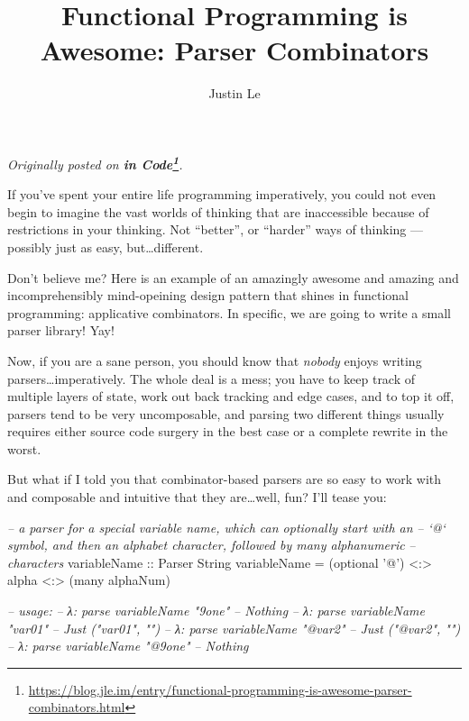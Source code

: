 \documentclass[]{article}
\title{Functional Programming is Awesome: Parser Combinators}
\author{Justin Le}
\newenvironment{Shaded}{}{}
\newcommand{\DataTypeTok}[1]{\textcolor[rgb]{0.56,0.13,0.00}{{#1}}}
\newcommand{\CharTok}[1]{\textcolor[rgb]{0.25,0.44,0.63}{{#1}}}
\newcommand{\CommentTok}[1]{\textcolor[rgb]{0.38,0.63,0.69}{\textit{{#1}}}}
\newcommand{\OtherTok}[1]{\textcolor[rgb]{0.00,0.44,0.13}{{#1}}}
\newcommand{\FunctionTok}[1]{\textcolor[rgb]{0.02,0.16,0.49}{{#1}}}
\newcommand{\NormalTok}[1]{{#1}}
\renewcommand{\href}[2]{#2\footnote{\url{#1}}}
\begin{document}
\maketitle

\emph{Originally posted on
\textbf{\href{https://blog.jle.im/entry/functional-programming-is-awesome-parser-combinators.html}{in
Code}}.}

If you've spent your entire life programming imperatively, you could not
even begin to imagine the vast worlds of thinking that are inaccessible
because of restrictions in your thinking. Not ``better'', or ``harder''
ways of thinking --- possibly just as easy, but\ldots{}different.

Don't believe me? Here is an example of an amazingly awesome and amazing
and incomprehensibly mind-opeining design pattern that shines in
functional programming: applicative combinators. In specific, we are
going to write a small parser library! Yay!

Now, if you are a sane person, you should know that \emph{nobody} enjoys
writing parsers\ldots{}imperatively. The whole deal is a mess; you have
to keep track of multiple layers of state, work out back tracking and
edge cases, and to top it off, parsers tend to be very uncomposable, and
parsing two different things usually requires either source code surgery
in the best case or a complete rewrite in the worst.

But what if I told you that combinator-based parsers are so easy to work
with and composable and intuitive that they are\ldots{}well, fun? I'll
tease you:

\begin{Shaded}
\begin{Highlighting}[]
\CommentTok{-- a parser for a special variable name, which can optionally start with an}
\CommentTok{-- `@` symbol, and then an alphabet character, followed by many alphanumeric}
\CommentTok{-- characters}
\OtherTok{variableName ::} \DataTypeTok{Parser} \DataTypeTok{String}
\NormalTok{variableName }\FunctionTok{=} \NormalTok{(optional }\CharTok{'@'}\NormalTok{) }\FunctionTok{<:>} \NormalTok{alpha }\FunctionTok{<:>} \NormalTok{(many alphaNum)}

\CommentTok{-- usage:}
\CommentTok{-- λ: parse variableName "9one"}
\CommentTok{-- Nothing}
\CommentTok{-- λ: parse variableName "var01"}
\CommentTok{-- Just ("var01", "")}
\CommentTok{-- λ: parse variableName "@var2"}
\CommentTok{-- Just ("@var2", "")}
\CommentTok{-- λ: parse variableName "@9one"}
\CommentTok{-- Nothing}
\end{Highlighting}
\end{Shaded}
\end{document}
